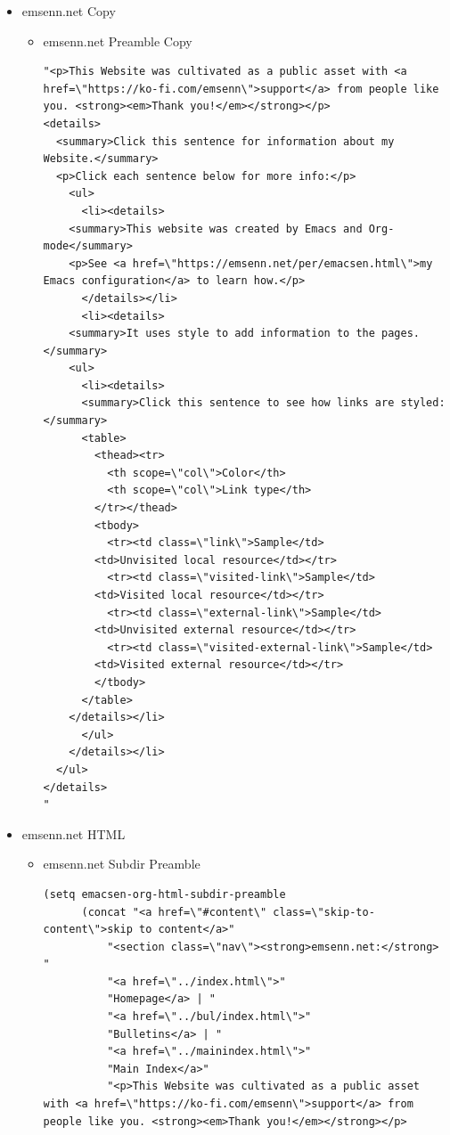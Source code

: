 \documentclass[11pt]{article}
\begin{document}
\begin{itemize}
\begin{itemize}
\begin{itemize}
\begin{itemize}
\begin{verbatim}
:publishing-directory "~/org/pub/emsenn-net"
:recursive t
:publishing-function org-publish-attachment)
\end{verbatim}
\end{itemize}
\item emsenn.net Copy
\label{sec:org95a80ea}
\begin{itemize}
\item emsenn.net Preamble Copy
\label{sec:orgda3c628}
\begin{verbatim}
"<p>This Website was cultivated as a public asset with <a href=\"https://ko-fi.com/emsenn\">support</a> from people like you. <strong><em>Thank you!</em></strong></p>
<details>
  <summary>Click this sentence for information about my Website.</summary>
  <p>Click each sentence below for more info:</p>
    <ul>
      <li><details>
	<summary>This website was created by Emacs and Org-mode</summary>
	<p>See <a href=\"https://emsenn.net/per/emacsen.html\">my Emacs configuration</a> to learn how.</p>
      </details></li>
      <li><details>
	<summary>It uses style to add information to the pages.</summary>
	<ul>
	  <li><details>
	  <summary>Click this sentence to see how links are styled:</summary>
	  <table>
	    <thead><tr>
	      <th scope=\"col\">Color</th>
	      <th scope=\"col\">Link type</th>
	    </tr></thead>
	    <tbody>
	      <tr><td class=\"link\">Sample</td>
		<td>Unvisited local resource</td></tr>
	      <tr><td class=\"visited-link\">Sample</td>
		<td>Visited local resource</td></tr>
	      <tr><td class=\"external-link\">Sample</td>
		<td>Unvisited external resource</td></tr>
	      <tr><td class=\"visited-external-link\">Sample</td>
		<td>Visited external resource</td></tr>
	    </tbody>
	  </table>
	</details></li>
      </ul>
    </details></li>
  </ul>
</details>
"
\end{verbatim}
\end{itemize}
\item emsenn.net HTML
\label{sec:org556b4f5}
\begin{itemize}
\item emsenn.net Subdir Preamble
\label{sec:org9346c4e}
\begin{verbatim}
(setq emacsen-org-html-subdir-preamble
      (concat "<a href=\"#content\" class=\"skip-to-content\">skip to content</a>"
	      "<section class=\"nav\"><strong>emsenn.net:</strong> "
	      "<a href=\"../index.html\">"
	      "Homepage</a> | "
	      "<a href=\"../bul/index.html\">"
	      "Bulletins</a> | "
	      "<a href=\"../mainindex.html\">"
	      "Main Index</a>"
	      "<p>This Website was cultivated as a public asset with <a href=\"https://ko-fi.com/emsenn\">support</a> from people like you. <strong><em>Thank you!</em></strong></p>

\end{verbatim}
\end{itemize}
\end{itemize}
\end{itemize}
\end{itemize}
\end{document}
